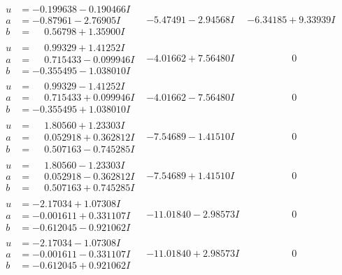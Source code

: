 \documentclass[1p]{elsarticle_modified}
\theoremstyle{definition}
\begin{document}
$$\begin{array}{c|c|c}
\begin{aligned}
u &= -0.199638 - 0.190466 I \\
a &= -0.87961 - 2.76905 I \\
b &= \phantom{-}0.56798 + 1.35900 I\end{aligned}
 & -5.47491 - 2.94568 I & -6.34185 + 9.33939 I \\ \hline\begin{aligned}
u &= \phantom{-}0.99329 + 1.41252 I \\
a &= \phantom{-}0.715433 - 0.099946 I \\
b &= -0.355495 - 1.038010 I\end{aligned}
 & -4.01662 + 7.56480 I & \phantom{-0.000000 } 0 \\ \hline\begin{aligned}
u &= \phantom{-}0.99329 - 1.41252 I \\
a &= \phantom{-}0.715433 + 0.099946 I \\
b &= -0.355495 + 1.038010 I\end{aligned}
 & -4.01662 - 7.56480 I & \phantom{-0.000000 } 0 \\ \hline\begin{aligned}
u &= \phantom{-}1.80560 + 1.23303 I \\
a &= \phantom{-}0.052918 + 0.362812 I \\
b &= \phantom{-}0.507163 - 0.745285 I\end{aligned}
 & -7.54689 - 1.41510 I & \phantom{-0.000000 } 0 \\ \hline\begin{aligned}
u &= \phantom{-}1.80560 - 1.23303 I \\
a &= \phantom{-}0.052918 - 0.362812 I \\
b &= \phantom{-}0.507163 + 0.745285 I\end{aligned}
 & -7.54689 + 1.41510 I & \phantom{-0.000000 } 0 \\ \hline\begin{aligned}
u &= -2.17034 + 1.07308 I \\
a &= -0.001611 + 0.331107 I \\
b &= -0.612045 - 0.921062 I\end{aligned}
 & -11.01840 - 2.98573 I & \phantom{-0.000000 } 0 \\ \hline\begin{aligned}
u &= -2.17034 - 1.07308 I \\
a &= -0.001611 - 0.331107 I \\
b &= -0.612045 + 0.921062 I\end{aligned}
 & -11.01840 + 2.98573 I & \phantom{-0.000000 } 0 \\ \hline\begin{aligned}

\end{aligned}
\end{array}$$
\end{document}

